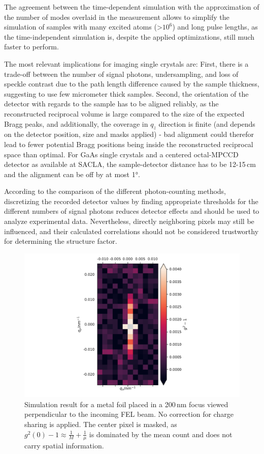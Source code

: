 The agreement between the time-dependent simulation with the approximation of the number of modes overlaid in the measurement allows to simplify the simulation of samples with many excited atoms (>$10^6$) and long pulse lengths, as the time-independent simulation is, despite the applied optimizations, still much faster to perform.

The most relevant implications for imaging single crystals are: First, there is a trade-off between the number of signal photons, undersampling, and loss of speckle contrast due to the path length difference caused by the sample thickness, suggesting to use few micrometer thick samples. Second, the orientation of the detector with regards to the sample has to be aligned reliably, as the reconstructed reciprocal volume is large compared to the size of the expected Bragg peaks, and additionally, the coverage in $q_z$ direction is finite (and depends on the detector position, size and masks applied) - bad alignment could therefor lead to fewer potential Bragg positions being inside the reconstructed reciprocal space than optimal. For GaAs single crystals and a centered octal-MPCCD detector as available at SACLA, the sample-detector distance has to be 12-15\,cm and the alignment can be off by at most 1°.

According to the comparison of the different photon-counting methods, discretizing the recorded detector values by finding appropriate thresholds for the different numbers of signal photons reduces detector effects and should be used to analyze experimental data. Nevertheless, directly neighboring pixels may still be influenced, and their calculated correlations should not be considered trustworthy for determining the structure factor.





\begin{figure}
	\centering
	\includegraphics[width=0.5\linewidth]{images/sim_foil5umCu_shared.pdf}

	\caption[Simulation of a metal foil with similar parameters as used in the experiment]{Simulation result for a metal foil placed in a 200\,nm focus viewed perpendicular to the incoming FEL beam. No correction for charge sharing is applied. The center pixel is masked, as $g^2(0)-1\approx 
		\frac{1}{M}+\frac{1}{\mu}$ is dominated by the mean count and does 
		not carry spatial information.}
	\label{fig:simfoil}
\end{figure}

